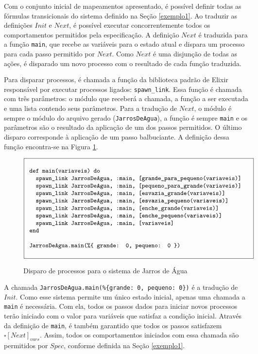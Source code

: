 Com o conjunto inicial de mapeamentos apresentado, é possível definir todas as fórmulas transicionais do sistema definido na Seção \ref{exemplo1}. Ao traduzir as definições $Init$ e $Next$, é possível executar concorrentemente todos os comportamentos permitidos pela especificação. A definição $Next$ é traduzida para a função \texttt{main}, que recebe as variáveis para o estado atual e dispara um processo para cada passo permitido por $Next$. Como $Next$ é uma disjunção de todas as ações, é disparado um novo processo com o resultado de cada função traduzida.

Para disparar processos, é chamada a função da biblioteca padrão de Elixir responsável por executar processos ligados: \texttt{spawn\_link}. Essa função é chamada com três parâmetros: o módulo que receberá a chamada, a função a ser executada e uma lista contendo seus parâmetros. Para a tradução de $Next$, o módulo é sempre o módulo do arquivo gerado (\texttt{JarrosDeAgua}), a função é sempre \texttt{main} e os parâmetros são o resultado da aplicação de um dos passos permitidos. O último disparo corresponde à aplicação de um passo balbuciante. A definição dessa função encontra-se na Figura \ref{fig:main-ex1}.

\begin{figure}[h]
  \centering
  $\progfig{
  ~def main(variaveis) do\\
  ~~~spawn\_link JarrosDeAgua, :main, [grande\_para\_pequeno(variaveis)]\\
  ~~~spawn\_link JarrosDeAgua, :main, [pequeno\_para\_grande(variaveis)]\\
  ~~~spawn\_link JarrosDeAgua, :main, [esvazia\_grande(variaveis)]\\
  ~~~spawn\_link JarrosDeAgua, :main, [esvazia\_pequeno(variaveis)]\\
  ~~~spawn\_link JarrosDeAgua, :main, [enche\_grande(variaveis)]\\
  ~~~spawn\_link JarrosDeAgua, :main, [enche\_pequeno(variaveis)]\\
  ~~~spawn\_link JarrosDeAgua, :main, [variaveis]\\
  ~end\\\\
  ~JarrosDeAgua.main(\%\{\ grande: 0, pequeno: 0 \})
  }$
  \caption{Disparo de processos para o sistema de Jarros de Água}
\label{fig:main-ex1}
\end{figure}

A chamada \texttt{JarrosDeAgua.main(\%\{grande: 0, pequeno: 0\})} é a tradução de $Init$. Como esse sistema permite um único estado inicial, apenas uma chamada a \texttt{main} é necessária. Com ela, todos os passos dados para iniciar novos processos terão iniciado com o valor para variáveis que satisfaz a condição inicial. Através da definição de \texttt{main}, é também garantido que todos os passos satisfazem $\square [Next]_{vars}$. Assim, todos os comportamentos iniciados com essa chamada são permitidos por $Spec$, conforme definida na Seção \ref{exemplo1}.

